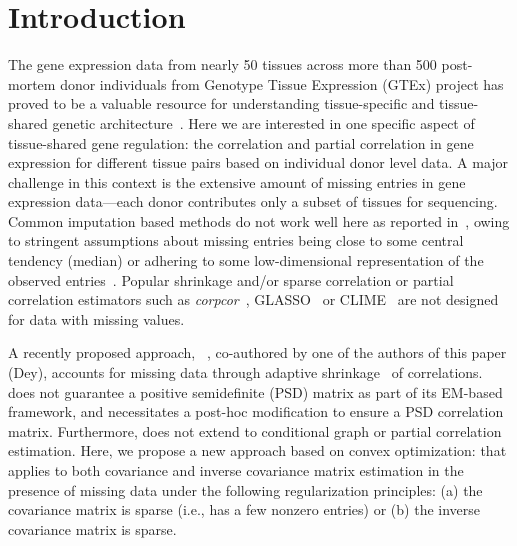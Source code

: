 \section{Introduction}

The gene expression data from nearly 50 tissues across more than 500 post-mortem donor individuals from Genotype Tissue Expression (GTEx) project has proved to be a valuable resource for understanding tissue-specific and tissue-shared genetic architecture~\cite{gtex2015, gtex2017, dey2017, aguet2019}. Here we are interested in one specific aspect of tissue-shared gene regulation: the correlation and partial correlation in gene expression for  different tissue pairs based on individual donor level data.  A major challenge in this context is the extensive amount of missing entries in gene expression data---each donor contributes only a subset of tissues for sequencing. 
Common imputation based methods do not work well here as reported in~\cite{dey2019}, owing to stringent assumptions about missing entries being close to some central tendency (median) or adhering to some low-dimensional representation of the observed entries~\cite{mazumder2010spectral,mazumder2015}. Popular shrinkage and/or sparse correlation or partial correlation estimators such as \textit{corpcor}~\cite{ledoit2003improved, schafer2005shrinkage}, GLASSO~\cite{friedman2008} or CLIME~\cite{cai2011} are not designed for data with missing values. 

A recently proposed approach, \CorShrink{}~\cite{dey2019}, co-authored by one of the authors of this paper (Dey), accounts for missing data through adaptive shrinkage~\cite{stephens2016} of correlations. \CorShrink{} does not guarantee a positive semidefinite (PSD) matrix as part of its EM-based framework, and necessitates a post-hoc modification to ensure a PSD correlation matrix. Furthermore, \CorShrink{} does not extend to conditional graph or partial correlation estimation. Here, we propose a new approach based on convex optimization: \Robocov{} that applies to both covariance and inverse covariance matrix estimation in the presence of missing data under the following regularization principles:
(a) the covariance matrix is sparse (i.e., has a few nonzero entries) or (b) the inverse covariance matrix is sparse. 

